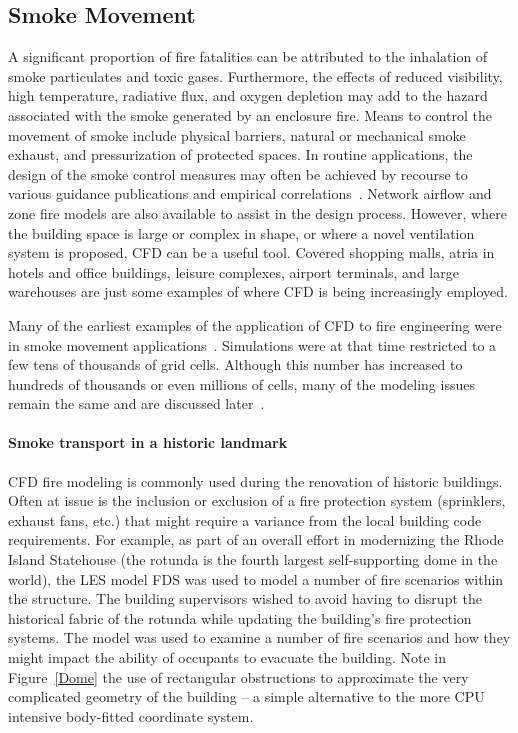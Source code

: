 \documentclass[graybox]{svmult}
\begin{document}
\subsection{Smoke Movement}

A significant proportion of fire fatalities can be attributed to the inhalation of smoke particulates and toxic gases. Furthermore, the effects of reduced visibility, high temperature, radiative flux, and oxygen depletion may add to the hazard associated with the smoke generated by an enclosure fire. Means to control the movement of smoke include physical barriers, natural or mechanical smoke exhaust, and pressurization of protected spaces. In routine applications, the design of the smoke control measures may often be achieved by recourse to various guidance publications and empirical correlations~\cite{Klote, NFPA:92B}. Network airflow and zone fire models are also available to assist in the design process. However, where the building space is large or complex in shape, or where a novel ventilation system is proposed, CFD can be a useful tool. Covered shopping malls, atria in hotels and office buildings, leisure complexes, airport terminals, and large warehouses are just some examples of where CFD is being increasingly employed.

Many  of  the  earliest  examples  of  the  application of CFD to fire engineering were in smoke movement applications~\cite{Pericleous, Cox:1990}. Simulations were at that time restricted to a few tens of thousands of grid cells. Although this number has increased to hundreds of thousands or even millions of cells, many of the modeling issues remain the same and are discussed later~\cite{Kumar}.




\paragraph{Smoke transport in a historic landmark}

CFD fire modeling is commonly used during the renovation of historic buildings. Often at issue is the inclusion or exclusion of a fire protection system (sprinklers, exhaust fans, etc.) that might require a variance from the local building code requirements. For example, as part of an overall effort in modernizing the Rhode Island Statehouse (the rotunda is the fourth largest self-supporting dome in the world), the LES model FDS was used to model a number of fire scenarios within the structure. The building supervisors wished to avoid having to disrupt the historical fabric of the rotunda while updating the building's fire protection systems. The model was used to examine a number of fire scenarios and how they might impact the ability of occupants to evacuate the building. Note in Figure~\ref{Dome} the use of rectangular obstructions to approximate the very complicated geometry of the building -- a simple alternative to the more CPU intensive body-fitted coordinate system.
\end{document}
